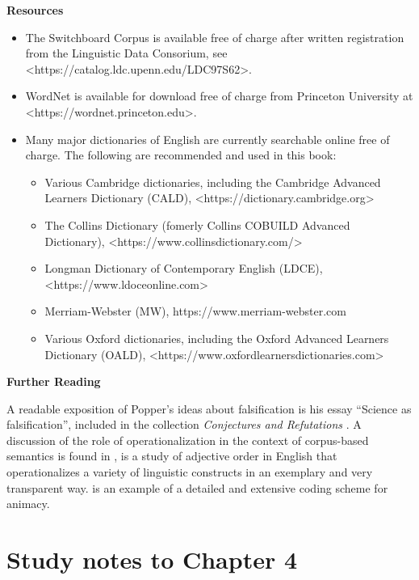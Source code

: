 \textbf{Resources}

\begin{itemize}
    \item The Switchboard Corpus is available free of charge after written registration from the Linguistic Data Consorium, see <https://catalog.ldc.upenn.edu/LDC97S62>.
    \item WordNet is available for download free of charge from Princeton University at <https://wordnet.princeton.edu>.
    \item Many major dictionaries of English are currently searchable online free of charge. The following are recommended and used in this book:
    \begin{itemize}
    	\item Various Cambridge dictionaries, including the Cambridge Advanced Learners Dictionary (CALD), <https://dictionary.cambridge.org>
    	\item The Collins Dictionary (fomerly Collins COBUILD Advanced Dictionary), <https://www.collinsdictionary.com/>
        \item Longman Dictionary of Contemporary English (LDCE), <https://www.ldoceonline.com>
        \item Merriam-Webster (MW), https://www.merriam-webster.com
        \item Various Oxford dictionaries, including the Oxford Advanced Learners Dictionary (OALD), <https://www.oxfordlearnersdictionaries.com>
    \end{itemize}
\end{itemize}

\textbf{Further Reading}

A readable exposition of Popper's ideas about falsification is his essay “Science as falsification”, included in the collection \textit{Conjectures and Refutations} \citet{popper_conjectures_1963}. A discussion of the role of operationalization in the context of corpus-based semantics is found in \citet{glynn_empirical_2010}, \citet{wulff_multifactorial_2003,} is a study of adjective order in English that operationalizes a variety of linguistic constructs in an exemplary and very transparent way. \citet{zaenen_animacy_2004} is an example of a detailed and extensive coding scheme for animacy.

\section{Study notes to Chapter 4}
\label{sec:studynotes04}


